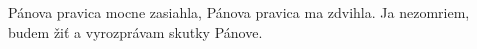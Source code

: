Pánova pravica mocne zasiahla,
Pánova pravica ma zdvihla.
Ja nezomriem, budem žiť
a vyrozprávam skutky Pánove.